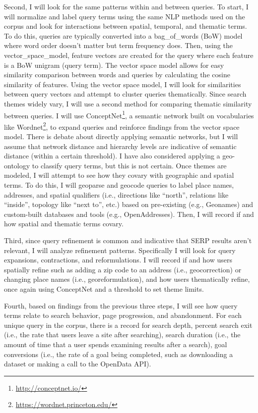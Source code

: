 Second, I will look for the same patterns within and between queries. To start, I will normalize and label query terms using the same NLP methods used on the corpus and look for interactions between spatial, temporal, and thematic terms. To do this, queries are typically converted into a \gls{bag_of_words} (\acrshort{BoW}) model where word order doesn't matter but term frequency does. Then, using the \gls{vector_space_model}, feature vectors are created for the query where each feature is a BoW unigram (query term). The vector space model allows for easy similarity comparison between words and queries by calculating the cosine similarity of features. Using the vector space model, I will look for similarities between query vectors and attempt to cluster queries thematically. Since search themes widely vary, I will use a second method for comparing thematic similarity between queries. I will use ConceptNet\footnote{\url{http://conceptnet.io/}}, a semantic network built on vocabularies like Wordnet\footnote{\url{https://wordnet.princeton.edu/}}, to expand queries and reinforce findings from the vector space model. There is debate about directly applying semantic networks, but I will assume that network distance and hierarchy levels are indicative of semantic distance (within a certain threshold). I have also considered applying a geo-ontology to classify query terms, but this is not certain. Once themes are modeled, I will attempt to see how they covary with geographic and spatial terms. To do this, I will geoparse and geocode queries to label place names, addresses, and spatial qualifiers (i.e., directions like “north”, relations like “inside”, topology like “next to”, etc.) based on pre-existing (e.g., Geonames) and custom-built databases and tools (e.g., OpenAddresses). Then, I will record if and how spatial and thematic terms covary.

Third, since query refinement is common and indicative that SERP results aren't relevant, I will analyze refinement patterns. Specifically I will look for query expansions, contractions, and reformulations. I will record if and how users spatially refine such as adding a zip code to an address (i.e., geocorrection) or changing place names (i.e., georeformulation), and how users thematically refine, once again using ConceptNet and a threshold to set theme limits.

Fourth, based on findings from the previous three steps, I will see how query terms relate to search behavior, page progression, and abandonment. For each unique query in the corpus, there is a record for search depth, percent search exit (i.e., the rate that users leave a site after searching), search duration (i.e., the amount of time that a user spends examining results after a search), goal conversions (i.e., the rate of a goal being completed, such as downloading a dataset or making a call to the OpenData API). 

